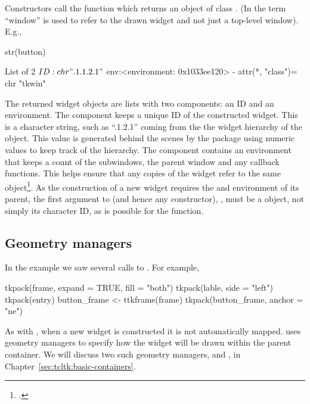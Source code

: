 Constructors call the  function which returns an
object of class . (In \TK\/ the term ``window'' is used to
refer to the drawn widget and not just a top-level window). E.g.,

\begin{Schunk}
\begin{Sinput}
 str(button)
\end{Sinput}
\begin{Soutput}
List of 2
 $ ID : chr ".1.1.2.1"
 $ env:<environment: 0x1033ee120> 
 - attr(*, "class")= chr "tkwin"
\end{Soutput}
\end{Schunk}

The returned widget objects are lists with two components: an ID and an
environment. The  component keeps a unique ID of the
constructed widget. This is a character string, such as ``.1.2.1''
coming from the the widget hierarchy of the object. This value is
generated behind the scenes by the  package using numeric
values to keep track of the hierarchy. The  component
contains an environment that keeps a count of the subwindows, the parent
window and any callback functions. This helps ensure that any copies
of the widget refer to the same object\footcite{Dalgaard-DSC}. As the
construction of a new widget requires the  and environment of
its parent, the first argument to  (and hence any constructor), ,
must be a  object, not simply its character ID, as is
possible for the  function.


\subsection{Geometry managers}
\label{sec:tcltk:overview:geometry-managers}

In the example we saw several calls to . For example,

\begin{Schunk}
\begin{Sinput}
 tkpack(frame, expand = TRUE, fill = "both")
 tkpack(lable, side = "left")
 tkpack(entry)
 button_frame <- ttkframe(frame)
 tkpack(button_frame, anchor = "ne")
\end{Sinput}
\end{Schunk}


As with \Qt, when a new widget is constructed it is not automatically
mapped. \TK\/ uses geometry managers to specify how the widget will be
drawn within the parent container. We will discuss two such geometry
managers,  and , in Chapter~\ref{sec:tcltk:basic-containers}.

